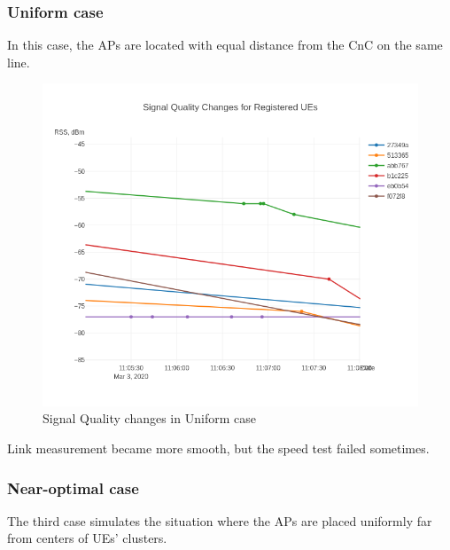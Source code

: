 \subsubsection{Uniform case}

In this case, the APs are located with equal distance from the CnC on the same line.

\begin{figure}[H]
	\centering
	\includegraphics[width=\linewidth,keepaspectratio]{images/Exp4_Uniform.png}
\caption{Signal Quality changes in Uniform case}
\end{figure}

Link measurement became more smooth, but the speed test failed
sometimes.

\subsubsection{Near-optimal case}

The third case simulates the situation where the APs are placed
uniformly far from centers of UEs' clusters.

